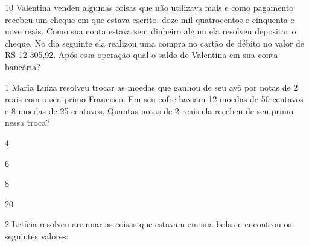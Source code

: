 
\num{10} Valentina vendeu algumas coisas que não utilizava mais e como
pagamento recebeu um cheque em que estava escrito: doze mil quatrocentos
e cinquenta e nove reais. Como sua conta estava sem dinheiro algum ela
resolveu depositar o cheque. No dia seguinte ela realizou uma compra no
cartão de débito no valor de RS 12 305,92. Após essa operação qual o
saldo de Valentina em sua conta bancária?




\num{1} Maria Luíza resolveu trocar as moedas que ganhou de seu avô por
notas de 2 reais com o seu primo Francisco. Em seu cofre haviam 12
moedas de 50 centavos e 8 moedas de 25 centavos. Quantas notas de 2
reais ela recebeu de seu primo nessa troca?

\begin{escolha}
\item
  4
\item
  6
\item
  8
\item
  20
\end{escolha}


\num{2} Letícia resolveu arrumar as coisas que estavam em sua bolsa e
encontrou os seguintes valores:


